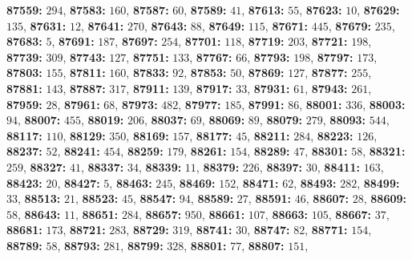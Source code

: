 \textsf{\bfseries 87559:} $294$, \textsf{\bfseries 87583:} $160$, \textsf{\bfseries 87587:} $60$, \textsf{\bfseries 87589:} $41$, \textsf{\bfseries 87613:} $55$, \textsf{\bfseries 87623:} $10$, \textsf{\bfseries 87629:} $135$, \textsf{\bfseries 87631:} $12$, \textsf{\bfseries 87641:} $270$, \textsf{\bfseries 87643:} $88$, \textsf{\bfseries 87649:} $115$, \textsf{\bfseries 87671:} $445$, \textsf{\bfseries 87679:} $235$, \textsf{\bfseries 87683:} $5$, \textsf{\bfseries 87691:} $187$, \textsf{\bfseries 87697:} $254$, \textsf{\bfseries 87701:} $118$, \textsf{\bfseries 87719:} $203$, \textsf{\bfseries 87721:} $198$, \textsf{\bfseries 87739:} $309$, \textsf{\bfseries 87743:} $127$, \textsf{\bfseries 87751:} $133$, \textsf{\bfseries 87767:} $66$, \textsf{\bfseries 87793:} $198$, \textsf{\bfseries 87797:} $173$, \textsf{\bfseries 87803:} $155$, \textsf{\bfseries 87811:} $160$, \textsf{\bfseries 87833:} $92$, \textsf{\bfseries 87853:} $50$, \textsf{\bfseries 87869:} $127$, \textsf{\bfseries 87877:} $255$, \textsf{\bfseries 87881:} $143$, \textsf{\bfseries 87887:} $317$, \textsf{\bfseries 87911:} $139$, \textsf{\bfseries 87917:} $33$, \textsf{\bfseries 87931:} $61$, \textsf{\bfseries 87943:} $261$, \textsf{\bfseries 87959:} $28$, \textsf{\bfseries 87961:} $68$, \textsf{\bfseries 87973:} $482$, \textsf{\bfseries 87977:} $185$, \textsf{\bfseries 87991:} $86$, \textsf{\bfseries 88001:} $336$, \textsf{\bfseries 88003:} $94$, \textsf{\bfseries 88007:} $455$, \textsf{\bfseries 88019:} $206$, \textsf{\bfseries 88037:} $69$, \textsf{\bfseries 88069:} $89$, \textsf{\bfseries 88079:} $279$, \textsf{\bfseries 88093:} $544$, \textsf{\bfseries 88117:} $110$, \textsf{\bfseries 88129:} $350$, \textsf{\bfseries 88169:} $157$, \textsf{\bfseries 88177:} $45$, \textsf{\bfseries 88211:} $284$, \textsf{\bfseries 88223:} $126$, \textsf{\bfseries 88237:} $52$, \textsf{\bfseries 88241:} $454$, \textsf{\bfseries 88259:} $179$, \textsf{\bfseries 88261:} $154$, \textsf{\bfseries 88289:} $47$, \textsf{\bfseries 88301:} $58$, \textsf{\bfseries 88321:} $259$, \textsf{\bfseries 88327:} $41$, \textsf{\bfseries 88337:} $34$, \textsf{\bfseries 88339:} $11$, \textsf{\bfseries 88379:} $226$, \textsf{\bfseries 88397:} $30$, \textsf{\bfseries 88411:} $163$, \textsf{\bfseries 88423:} $20$, \textsf{\bfseries 88427:} $5$, \textsf{\bfseries 88463:} $245$, \textsf{\bfseries 88469:} $152$, \textsf{\bfseries 88471:} $62$, \textsf{\bfseries 88493:} $282$, \textsf{\bfseries 88499:} $33$, \textsf{\bfseries 88513:} $21$, \textsf{\bfseries 88523:} $45$, \textsf{\bfseries 88547:} $94$, \textsf{\bfseries 88589:} $27$, \textsf{\bfseries 88591:} $46$, \textsf{\bfseries 88607:} $28$, \textsf{\bfseries 88609:} $58$, \textsf{\bfseries 88643:} $11$, \textsf{\bfseries 88651:} $284$, \textsf{\bfseries 88657:} $950$, \textsf{\bfseries 88661:} $107$, \textsf{\bfseries 88663:} $105$, \textsf{\bfseries 88667:} $37$, \textsf{\bfseries 88681:} $173$, \textsf{\bfseries 88721:} $283$, \textsf{\bfseries 88729:} $319$, \textsf{\bfseries 88741:} $30$, \textsf{\bfseries 88747:} $82$, \textsf{\bfseries 88771:} $154$, \textsf{\bfseries 88789:} $58$, \textsf{\bfseries 88793:} $281$, \textsf{\bfseries 88799:} $328$, \textsf{\bfseries 88801:} $77$, \textsf{\bfseries 88807:} $151$, 
